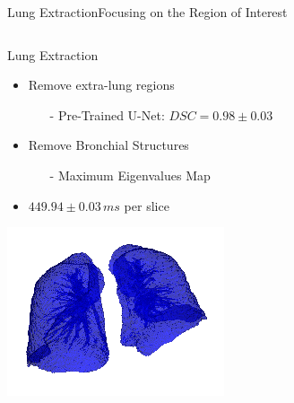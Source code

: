 \documentclass{standalone}
\begin{document}
	\begin{frame}{Lung Extraction}{Focusing on the Region of Interest}
				\begin{columns}
			\begin{column}{.5\textwidth}
				\begin{block}{Lung Extraction}
					\begin{itemize}
						
						\item Remove extra-lung regions
						\begin{itemize}\tiny
							\item[-] Pre-Trained U-Net: $DSC = 0.98\pm 0.03$
						\end{itemize}
						
						\item Remove Bronchial Structures
						\begin{itemize}\tiny
							\item[-] Maximum Eigenvalues Map
						\end{itemize}
											
						\item $449.94\pm 0.03\,ms$ per slice
						
					\end{itemize}
				\end{block}
				\centering\includegraphics[width=.8\linewidth]{./img/3DLung.png}
			\end{column}
			\begin{column}{0.5\textwidth}
				

\end{column}
\end{columns}
\end{frame}
\end{document}
